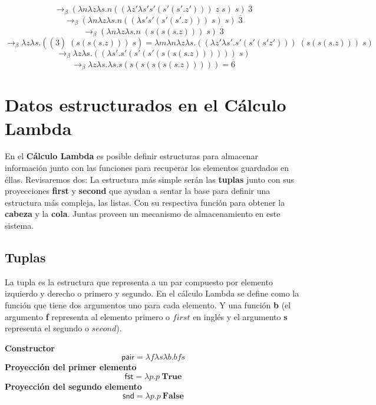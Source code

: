 \begin{exercise}
\[            \]
            \[
                    \rightarrow_\beta (\lambda n\lambda z\lambda s.n((\lambda z'\lambda s's'(s'(s'.z'))) \; z \; s) \; s )  \; \overline{3}
            \]
            \[
                    \rightarrow_\beta (\lambda n\lambda z\lambda s.n((\lambda s's'(s'(s'.z))) \; s) \; s )  \; \overline{3}
            \]
            \[
                    \rightarrow_\beta (\lambda n\lambda z\lambda s.n \; (s(s(s.z))) \; s )  \; \overline{3}
            \]
            \[
                    \rightarrow_\beta \lambda z\lambda s.((\overline{3}) \; (s(s(s.z))) \; s) = \lambda m\lambda n\lambda z\lambda s.(( \lambda z'\lambda s'.s'(s'(s'z'))) \; (s(s(s.z))) \; s)
            \]
            \[
                    \rightarrow_\beta \lambda z\lambda s.((\lambda s'.s'(s'(s'(s(s(s.z))))))  \; s)
            \]
            \[
                    \rightarrow_\beta \lambda z\lambda s.\lambda s.s(s(s(s(s(s.z))))) = \overline{6}
            \]
        \end{exercise}

        \section{Datos estructurados en el Cálculo Lambda}

            En el \textbf{Cálculo Lambda} es posible definir estructuras para almacenar información junto con las funciones para recuperar los elementos guardados en éllas.
            Revisaremos dos: La estructura más simple serán las \textbf{tuplas} junto con sus proyecciones \textbf{first} y \textbf{second} que ayudan a sentar la base para definir una estructura más compleja, las listas. Con su respectiva función para obtener la \textbf{cabeza} y la \textbf{cola}. Juntas proveen un mecanismo de almacenamiento en este sistema.
    
            \subsection{Tuplas}

                La tupla es la estructura que representa a un par compuesto por elemento izquierdo y derecho o primero y segundo. En el cálculo Lambda se define como la función que tiene dos argumentos uno para cada elemento. Y una función \textbf{b} (el argumento \textbf{f} representa al elemento primero o $first$ en inglés y el argumento \textbf{s} representa el segundo o $second$).
        
                \begin{definition}
            
                    \textbf{Constructor}
                        $$\mathsf{pair} = \lambda f\lambda s\lambda b. bfs$$
                    \textbf{Proyección del primer elemento}
                        $$\mathsf{fst} = \lambda p.p \ \textbf{True}$$
                    \textbf{Proyección del segundo elemento}
                        $$\mathsf{snd} = \lambda p.p \ \textbf{False}$$
                \end{definition}


